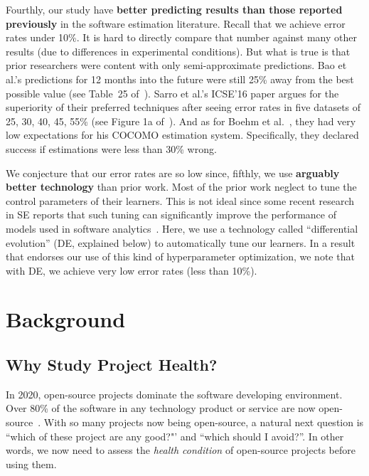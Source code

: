 \documentclass[sigconf,review,anonymous]{acmart}
\begin{document}
Fourthly, our study have {\bf better predicting results than those reported previously} in the software estimation literature. 
Recall that   we achieve error rates under 10\%.
It is hard to directly compare that number against many other results
(due to differences in experimental conditions). But what is true is  that prior researchers were  content with only
semi-approximate predictions.
Bao et al.'s predictions for 12  months into the future were still 25\% away from the best possible value (see Table~25 of~\cite{bao2019large}).
Sarro et al.'s ICSE'16  paper argues for the superiority of their preferred techniques after seeing error rates in five datasets
of 25, 30, 40, 45, 55\% (see Figure 1a of~\cite{sarro2016multi}).
And as for Boehm et al.~\cite{boehm2000cost}, they had very low expectations for his COCOMO estimation system.
Specifically, they declared success if estimations were less than 30\% wrong.
 
We conjecture that our error rates are so low since,
fifthly, we use {\bf arguably better technology} than prior work. 
Most of the prior work neglect to tune the control parameters of their learners.
This is not ideal since some recent research in SE reports that such tuning can significantly improve the performance of models used in software analytics~\cite{Tantithamthavorn16,fu2016differential,Fu2016TuningFS,agrawal2018betterdata,agrawal2019dodge,agrawal2018better}.
Here,  we use
a technology called ``differential evolution'' (DE, explained below) to automatically tune  our learners.
In a result that endorses our use of  this kind of hyperparameter optimization,
we note that with DE, we achieve very low error rates (less than 10\%).


 

\section{Background}
\label{sect:backg}
\subsection{Why Study Project Health?}
In 2020, open-source projects dominate the software developing environment\cite{Paasivaara18,santos2016investigating,Hohl18,Parnin17}.
Over 80\% of the software in any technology product or service are now open-source~\cite{zemlin2017}. 
With so many projects now being open-source, a natural next question is ``which of these project are any good?"' and ``which should I avoid?''.
 In other words, we now need to assess
 the   {\em health condition} of open-source projects before using them.
 
\end{document}
